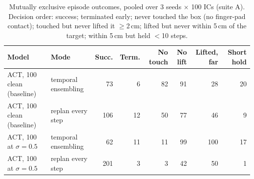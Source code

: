 \begin{table}[t]
\centering
\scriptsize
%
\begin{tabular}{llrrrrrr}
\toprule
Model & Mode & Succ. & Term. & No touch & No lift & Lifted, far & Short hold \\
\midrule
ACT, 100 clean (baseline) & temporal ensembling & 73 & 6 & 82 & 91 & 28 & 20 \\
ACT, 100 clean (baseline) & replan every step & 106 & 12 & 50 & 77 & 46 & 9 \\
ACT, 100 at $\sigma{=}0.5$ & temporal ensembling & 62 & 11 & 11 & 99 & 100 & 17 \\
ACT, 100 at $\sigma{=}0.5$ & replan every step & 201 & 3 & 3 & 42 & 50 & 1 \\
\bottomrule
\end{tabular}
%
\caption{Mutually exclusive episode outcomes, pooled over 3 seeds $\times$ 100 ICs (suite A). Decision order: success; terminated early; never touched the box (no finger-pad contact); touched but never lifted it $\geq$2\,cm; lifted but never within 5\,cm of the target; within 5\,cm but held $<$10 steps.}
\label{tab:taxonomy}
\end{table}
